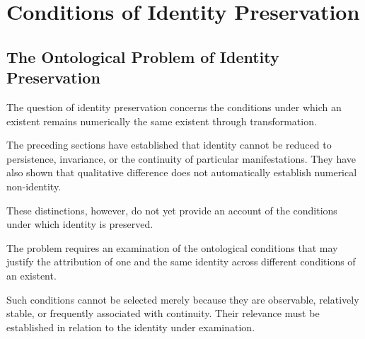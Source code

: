 %
%

\section{Conditions of Identity Preservation}
\label{sec:conditions-of-identity-preservation}

\subsection{The Ontological Problem of Identity Preservation}

The question of identity preservation concerns the
conditions under which an existent remains numerically
the same existent through transformation.

The preceding sections have established that identity
cannot be reduced to persistence, invariance, or the
continuity of particular manifestations. They have
also shown that qualitative difference does not
automatically establish numerical non-identity.

These distinctions, however, do not yet provide
an account of the conditions under which identity
is preserved.

The problem requires an examination of the ontological
conditions that may justify the attribution of one
and the same identity across different conditions
of an existent.

Such conditions cannot be selected merely because
they are observable, relatively stable, or frequently
associated with continuity. Their relevance must
be established in relation to the identity under
examination.

